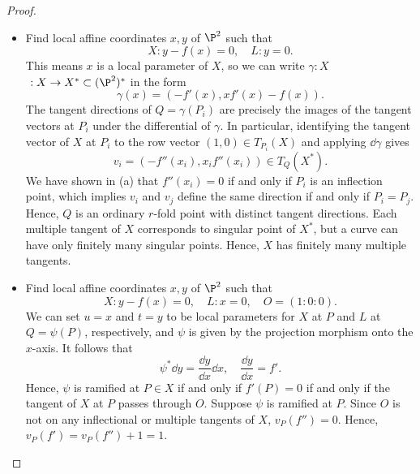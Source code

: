 \documentclass[a4paper]{article}
\begin{document}
\begin{enumerate} [label=\textbf{\arabic*.}, leftmargin=0em]
\begin{proof}
\begin{itemize} [leftmargin=0cm]
            \item[(b)] Find local affine coordinates $x, y$ of $\P^2$ such that
                  \begin{equation*}
                    X : y - f(x) = 0, \quad L : y = 0.
                  \end{equation*}
                  This means $x$ is a local parameter of $X$, so we can write $\gamma : X$ $\ : X \to X^* \subset (\P^2)^*$ in the form
                  \begin{equation*}
                    \gamma(x) = (-f'(x), xf'(x) - f(x)).
                  \end{equation*}
                  The tangent directions of $Q = \gamma(P_i)$ are precisely the images of the tangent vectors at $P_i$ under the differential of $\gamma$.
                  In particular, identifying the tangent vector of $X$ at $P_i$ to the row vector $(1, 0) \in T_{P_i}(X)$ and applying $\dd \gamma$ gives
                  \begin{equation*}
                    v_i = (-f''(x_i), x_if''(x_i)) \in T_Q(X^*).
                  \end{equation*}
                  We have shown in (a) that $f''(x_i) = 0$ if and only if $P_i$ is an inflection point, which implies $v_i$ and $v_j$ define the same direction if and only if $P_i = P_j$.
                  Hence, $Q$ is an ordinary $r$-fold point with distinct tangent directions.
                  Each multiple tangent of $X$ corresponds to singular point of $X^*$, but a curve can have only finitely many singular points.
                  Hence, $X$ has finitely many multiple tangents.

            \item[(c)] Find local affine coordinates $x, y$ of $\P^2$ such that
                  \begin{equation*}
                    X : y - f(x) = 0, \quad L : x = 0, \quad O = (1 : 0 : 0).
                  \end{equation*}
                  We can set $u = x$ and $t = y$ to be local parameters for $X$ at $P$ and $L$ at $Q = \psi(P)$, respectively, and $\psi$ is given by the projection morphism onto the $x$-axis.
                  It follows that
                  \begin{equation*}
                    \psi^* \dd y = \frac{\dd y}{\dd x} \dd x, \quad \frac{\dd y}{\dd x} = f'.
                  \end{equation*}
                  Hence, $\psi$ is ramified at $P \in X$ if and only if $f'(P) = 0$ if and only if the tangent of $X$ at $P$ passes through $O$.
                  Suppose $\psi$ is ramified at $P$.
                  Since $O$ is not on any inflectional or multiple tangents of $X$, $v_P(f'') = 0$.
                  Hence, $v_P(f') = v_P(f'') + 1 = 1$.


\end{itemize}
\end{proof}
\end{enumerate}
\end{document}
